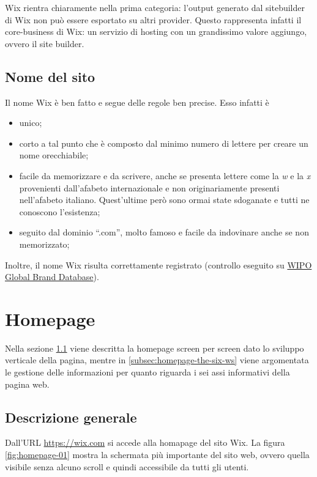 \documentclass[11pt,a4paper]{article}
\newcommand*{\wix}{Wix}
\begin{document}
\wix{} rientra chiaramente nella prima categoria: l'output generato
dal sitebuilder di \wix{} non può essere esportato su altri
provider. Questo rappresenta infatti il core-business di \wix{}: un
servizio di hosting con un grandissimo valore aggiungo, ovvero il site
builder. 

\subsection{Nome del sito}
\label{subsec:site-name}

Il nome \wix{} è ben fatto e segue delle regole ben precise. Esso infatti è

\begin{itemize}
  \item unico;
  \item corto a tal punto che è composto dal minimo numero di lettere
    per creare un nome orecchiabile;
  \item facile da memorizzare e da scrivere, anche se presenta lettere
    come la \emph{w} e la \emph{x} provenienti dall'afabeto
    internazionale e non originariamente presenti nell'afabeto
    italiano. Quest'ultime però sono ormai state sdoganate e tutti ne
    conoscono l'esistenza;
  \item seguito dal dominio ``.com'', molto famoso e facile da
    indovinare anche se non memorizzato;
\end{itemize}

Inoltre, il nome \wix{} risulta correttamente registrato (controllo eseguito su \href{https://www3.wipo.int/branddb/en/}{WIPO
  Global Brand Database}).


\section{Homepage}
\label{sec:homepage-analysis}

Nella sezione \ref{subsec:homepage-description} viene descritta la
homepage screen per screen dato lo sviluppo verticale della pagina,
mentre in \ref{subsec:homepage-the-six-ws} viene argomentata le
gestione delle informazioni per quanto riguarda i sei assi informativi
della pagina web.

\subsection{Descrizione generale}
\label{subsec:homepage-description}

Dall'URL \url{https://wix.com} si accede alla homapage del sito
\wix{}. La figura \ref{fig:homepage-01} mostra la schermata più
importante del sito web, ovvero quella visibile senza alcuno scroll e
quindi accessibile da tutti gli utenti.
\end{document}
